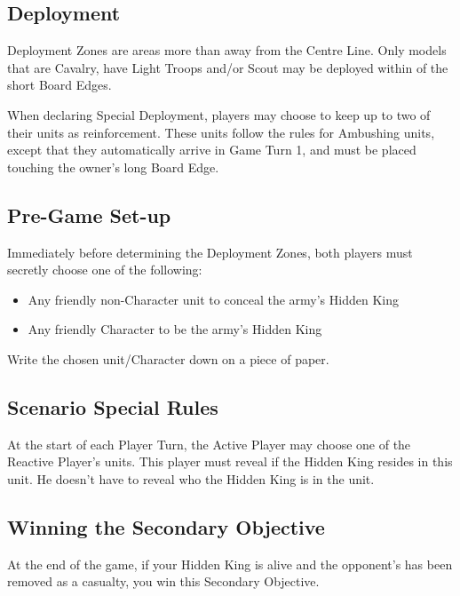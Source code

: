 
\label{TheHiddenKings}


\subsection*{Deployment}

Deployment Zones are areas more than  away from the Centre Line. Only models that are Cavalry, have Light Troops and/or Scout may be deployed within  of the short Board Edges.

When declaring Special Deployment, players may choose to keep up to two of their units as reinforcement. These units follow the rules for Ambushing units, except that they automatically arrive in Game Turn 1, and must be placed touching the owner's long Board Edge.


\subsection*{Pre-Game Set-up}

Immediately before determining the Deployment Zones, both players must secretly choose one of the following:

\begin{itemize}
\item Any friendly non-Character unit to conceal the army's Hidden King
\item Any friendly Character to be the army's Hidden King
\end{itemize}

Write the chosen unit/Character down on a piece of paper.

\subsection*{Scenario Special Rules}

At the start of each Player Turn, the Active Player may choose one of the Reactive Player's units. This player must reveal if the Hidden King resides in this unit. He doesn't have to reveal who the Hidden King is in the unit.

\subsection*{Winning the Secondary Objective}

At the end of the game, if your Hidden King is alive and the opponent's has been removed as a casualty, you win this Secondary Objective.
